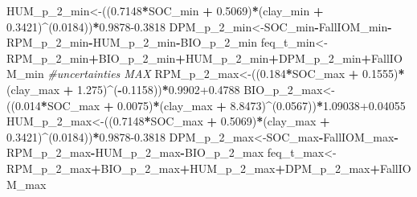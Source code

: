 \documentclass[
  10pt,
  b5paper,
]{book}
\newenvironment{Shaded}{\begin{snugshade}}{\end{snugshade}}
\newcommand{\CommentTok}[1]{\textcolor[rgb]{0.56,0.35,0.01}{\textit{#1}}}
\newcommand{\DecValTok}[1]{\textcolor[rgb]{0.00,0.00,0.81}{#1}}
\newcommand{\FloatTok}[1]{\textcolor[rgb]{0.00,0.00,0.81}{#1}}
\newcommand{\NormalTok}[1]{#1}
\newcommand{\OperatorTok}[1]{\textcolor[rgb]{0.81,0.36,0.00}{\textbf{#1}}}
\newcommand{\StringTok}[1]{\textcolor[rgb]{0.31,0.60,0.02}{#1}}
\begin{document}
\begin{Shaded}
\begin{Highlighting}[]
\NormalTok{HUM_p_}\DecValTok{2}\NormalTok{_min<-((}\FloatTok{0.7148}\OperatorTok{*}\NormalTok{SOC_min }\OperatorTok{+}\StringTok{ }\FloatTok{0.5069}\NormalTok{)}\OperatorTok{*}\NormalTok{(clay_min }\OperatorTok{+}\StringTok{ }\FloatTok{0.3421}\NormalTok{)}\OperatorTok{^}\NormalTok{(}\FloatTok{0.0184}\NormalTok{))}\OperatorTok{*}\FloatTok{0.9878-0.3818}
\NormalTok{DPM_p_}\DecValTok{2}\NormalTok{_min<-SOC_min}\OperatorTok{-}\NormalTok{FallIOM_min}\OperatorTok{-}\NormalTok{RPM_p_}\DecValTok{2}\NormalTok{_min}\OperatorTok{-}\NormalTok{HUM_p_}\DecValTok{2}\NormalTok{_min}\OperatorTok{-}\NormalTok{BIO_p_}\DecValTok{2}\NormalTok{_min}
\NormalTok{feq_t_min<-RPM_p_}\DecValTok{2}\NormalTok{_min}\OperatorTok{+}\NormalTok{BIO_p_}\DecValTok{2}\NormalTok{_min}\OperatorTok{+}\NormalTok{HUM_p_}\DecValTok{2}\NormalTok{_min}\OperatorTok{+}\NormalTok{DPM_p_}\DecValTok{2}\NormalTok{_min}\OperatorTok{+}\NormalTok{FallIOM_min}
\CommentTok{#uncertainties  MAX}
\NormalTok{RPM_p_}\DecValTok{2}\NormalTok{_max<-((}\FloatTok{0.184}\OperatorTok{*}\NormalTok{SOC_max }\OperatorTok{+}\StringTok{ }\FloatTok{0.1555}\NormalTok{)}\OperatorTok{*}\NormalTok{(clay_max }\OperatorTok{+}\StringTok{ }\FloatTok{1.275}\NormalTok{)}\OperatorTok{^}\NormalTok{(}\OperatorTok{-}\FloatTok{0.1158}\NormalTok{))}\OperatorTok{*}\FloatTok{0.9902+0.4788}
\NormalTok{BIO_p_}\DecValTok{2}\NormalTok{_max<-((}\FloatTok{0.014}\OperatorTok{*}\NormalTok{SOC_max }\OperatorTok{+}\StringTok{ }\FloatTok{0.0075}\NormalTok{)}\OperatorTok{*}\NormalTok{(clay_max }\OperatorTok{+}\StringTok{ }\FloatTok{8.8473}\NormalTok{)}\OperatorTok{^}\NormalTok{(}\FloatTok{0.0567}\NormalTok{))}\OperatorTok{*}\FloatTok{1.09038+0.04055}
\NormalTok{HUM_p_}\DecValTok{2}\NormalTok{_max<-((}\FloatTok{0.7148}\OperatorTok{*}\NormalTok{SOC_max }\OperatorTok{+}\StringTok{ }\FloatTok{0.5069}\NormalTok{)}\OperatorTok{*}\NormalTok{(clay_max }\OperatorTok{+}\StringTok{ }\FloatTok{0.3421}\NormalTok{)}\OperatorTok{^}\NormalTok{(}\FloatTok{0.0184}\NormalTok{))}\OperatorTok{*}\FloatTok{0.9878-0.3818}
\NormalTok{DPM_p_}\DecValTok{2}\NormalTok{_max<-SOC_max}\OperatorTok{-}\NormalTok{FallIOM_max}\OperatorTok{-}\NormalTok{RPM_p_}\DecValTok{2}\NormalTok{_max}\OperatorTok{-}\NormalTok{HUM_p_}\DecValTok{2}\NormalTok{_max}\OperatorTok{-}\NormalTok{BIO_p_}\DecValTok{2}\NormalTok{_max}
\NormalTok{feq_t_max<-RPM_p_}\DecValTok{2}\NormalTok{_max}\OperatorTok{+}\NormalTok{BIO_p_}\DecValTok{2}\NormalTok{_max}\OperatorTok{+}\NormalTok{HUM_p_}\DecValTok{2}\NormalTok{_max}\OperatorTok{+}\NormalTok{DPM_p_}\DecValTok{2}\NormalTok{_max}\OperatorTok{+}\NormalTok{FallIOM_max}
\end{Highlighting}
\end{Shaded}
\end{document}
